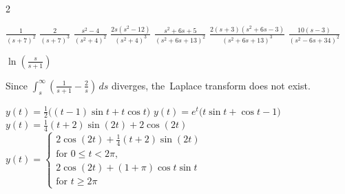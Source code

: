\begin{multicols}{2}\scriptsize
	\begin{Answer}[ref={EX73}]
		\Question 
		\begin{tasks}
			\task $\frac{1}{(s+7)^2}$
			\task $\frac{2}{(s+7)^3}$
			\task $\frac{s^2-4}{\left(s^2+4\right)^2}$
			\task $\frac{2 s \left(s^2-12\right)}{\left(s^2+4\right)^3}$
			\task $\frac{s^2+6 s+5}{\left(s^2+6 s+13\right)^2}$
			\task $\frac{2 (s+3) \left(s^2+6 s-3\right)}{\left(s^2+6 s+13\right)^3}$
			\task $\frac{10 (s-3)}{\left(s^2-6 s+34\right)^2}$
		\end{tasks} 
		
		\Question   $\ln \left(\frac{s}{s+1}\right)$ 
	
		\Question Since  $\int_s^\infty \left(\frac{1 }{s+1}- \frac{2}{s}\right)\, ds$ diverges, the~Laplace transform does not exist.
		
		\Question 
		\begin{tasks}[resume=false]
			\task $y(t)=\frac{1}{2} \big((t-1) \sin t+t \cos t\big)$
			\task $y(t)=e^t \big(t \sin t+\cos t-1\big)$
			\task $y(t)=\frac{1}{4} (t+2) \sin (2 t)+2 \cos (2 t)$
			\task $y(t)=\begin{cases}
				2 \cos (2 t)+\frac{1}{4} (t+2) \sin (2 t)\\
				\text {for }   0\le t<2 \pi,\\
					2 \cos (2 t)+(1+\pi ) \cos t \sin t\\
				\text{for } t\ge 2 \pi
			\end{cases}$ 
		\end{tasks}
%		
		
	\end{Answer}
\end{multicols}

%

%	




